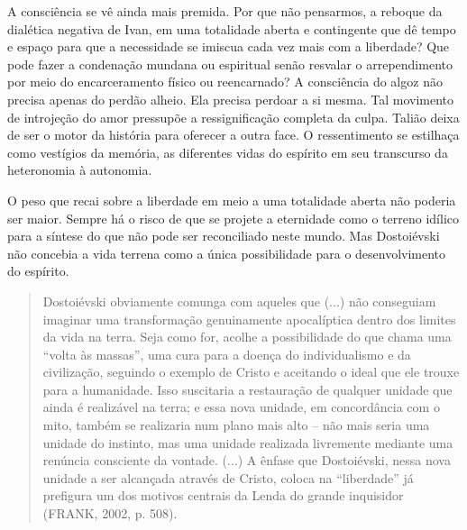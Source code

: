 A consciência se vê ainda mais premida. Por que não pensarmos, a reboque
da dialética negativa de Ivan, em uma totalidade aberta e contingente
que dê tempo e espaço para que a necessidade se imiscua cada vez mais
com a liberdade? Que pode fazer a condenação mundana ou espiritual senão
resvalar o arrependimento por meio do encarceramento físico ou
reencarnado? A consciência do algoz não precisa apenas do perdão alheio.
Ela precisa perdoar a si mesma. Tal movimento de introjeção do amor
pressupõe a ressignificação completa da culpa. Talião deixa de ser o
motor da história para oferecer a outra face. O ressentimento se
estilhaça como vestígios da memória, as diferentes vidas do espírito em
seu transcurso da heteronomia à autonomia.

O peso que recai sobre a liberdade em meio a uma totalidade aberta não
poderia ser maior. Sempre há o risco de que se projete a eternidade como
o terreno idílico para a síntese do que não pode ser reconciliado neste
mundo. Mas Dostoiévski não concebia a vida terrena como a única
possibilidade para o desenvolvimento do espírito.

\begin{quote}
Dostoiévski obviamente comunga com aqueles que (...) não conseguiam
imaginar uma transformação genuinamente apocalíptica dentro dos limites
da vida na terra. Seja como for, acolhe a possibilidade do que chama uma
``volta às massas'', uma cura para a doença do individualismo e da
civilização, seguindo o exemplo de Cristo e aceitando o ideal que ele
trouxe para a humanidade. Isso suscitaria a restauração de qualquer
unidade que ainda é realizável na terra; e essa nova unidade, em
concordância com o mito, também se realizaria num plano mais alto -- não
mais seria uma unidade do instinto, mas uma unidade realizada livremente
mediante uma renúncia consciente da vontade. (...) A ênfase que
Dostoiévski, nessa nova unidade a ser alcançada através de Cristo,
coloca na ``liberdade'' já prefigura um dos motivos centrais da Lenda do
grande inquisidor (FRANK, 2002, p. 508).
\end{quote}

